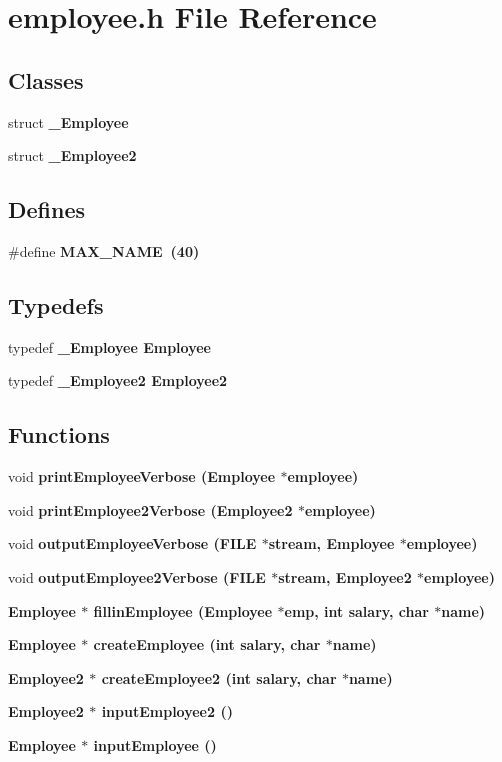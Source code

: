 \section{employee.h File Reference}
\label{employee_8h}
\subsection*{Classes}
\begin{CompactItemize}
\item 
struct \bf{\_\-Employee}
\item 
struct \bf{\_\-Employee2}
\end{CompactItemize}
\subsection*{Defines}
\begin{CompactItemize}
\item 
\#define \bf{MAX\_\-NAME}~(40)
\end{CompactItemize}
\subsection*{Typedefs}
\begin{CompactItemize}
\item 
typedef \bf{\_\-Employee} \bf{Employee}
\item 
typedef \bf{\_\-Employee2} \bf{Employee2}
\end{CompactItemize}
\subsection*{Functions}
\begin{CompactItemize}
\item 
void \bf{print\-Employee\-Verbose} (\bf{Employee} $\ast$employee)
\item 
void \bf{print\-Employee2Verbose} (\bf{Employee2} $\ast$employee)
\item 
void \bf{output\-Employee\-Verbose} (FILE $\ast$stream, \bf{Employee} $\ast$employee)
\item 
void \bf{output\-Employee2Verbose} (FILE $\ast$stream, \bf{Employee2} $\ast$employee)
\item 
\bf{Employee} $\ast$ \bf{fillin\-Employee} (\bf{Employee} $\ast$emp, int salary, char $\ast$name)
\item 
\bf{Employee} $\ast$ \bf{create\-Employee} (int salary, char $\ast$name)
\item 
\bf{Employee2} $\ast$ \bf{create\-Employee2} (int salary, char $\ast$name)
\item 
\bf{Employee2} $\ast$ \bf{input\-Employee2} ()
\item 
\bf{Employee} $\ast$ \bf{input\-Employee} ()
\end{CompactItemize}


